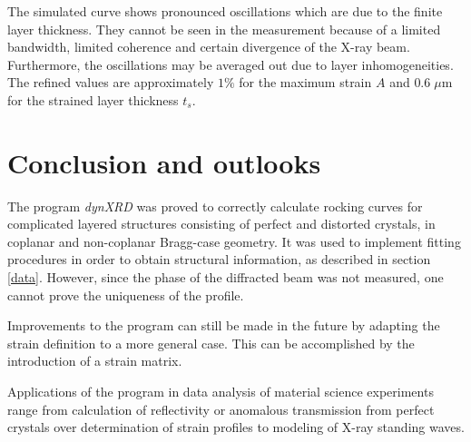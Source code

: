 \documentclass[12pt,oneside,notitlepage,abstracton,a4paper]{scrartcl}
\begin{document}
The simulated curve shows pronounced oscillations which are due to the finite layer thickness. They cannot be seen in the measurement because of a limited bandwidth, limited coherence and certain divergence of the X-ray beam. Furthermore, the oscillations may be averaged out due to layer inhomogeneities. The refined values are approximately $1 \%$ for the maximum strain $A$ and $0.6\;\mu$m for the strained layer thickness $t_s$.\\

% 
% 



\section{Conclusion and outlooks}
The program \textit{dynXRD} was proved to correctly calculate rocking curves for complicated layered structures consisting of perfect and distorted crystals, in coplanar and non-coplanar Bragg-case geometry. It was used to implement fitting procedures in order to obtain structural information, as described in section \ref{data}. However, since the phase of the diffracted beam was not measured, one cannot prove the uniqueness of the profile. 

Improvements to the program can still be made in the future by adapting the strain definition to a more general case. This can be accomplished by the introduction of a strain matrix.

Applications of the program in data analysis of material science experiments range from calculation of reflectivity or anomalous transmission from perfect crystals over determination of strain profiles to modeling of X-ray standing waves. 

\clearpage 



\nocite{*}
 
{}
\end{document}

